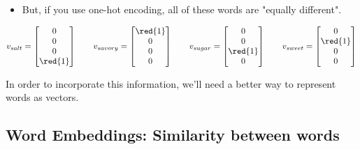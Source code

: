        \begin{itemize}
            \item But, if you use one-hot encoding, all of these words are "equally different".
        \end{itemize}

        \begin{equation}
            v_{salt} = 
            \begin{bmatrix}
              0\\0\\0\\ \red{1}
            \end{bmatrix}
            \qquad
            v_{savory} = 
            \begin{bmatrix}
              \red{1}\\0\\0\\0
            \end{bmatrix}
            \qquad
            v_{sugar} = 
            \begin{bmatrix}
              0\\0\\\red{1}\\0
            \end{bmatrix}
            \qquad
            v_{sweet} = 
            \begin{bmatrix}
              0\\\red{1}\\0\\0
            \end{bmatrix}
        \end{equation}

        In order to incorporate this information, we'll need a better way to represent words as vectors.

    \phantom{}

    \subsection{Word Embeddings: Similarity between words}

